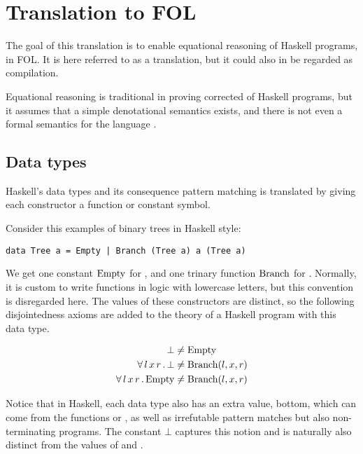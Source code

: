 \section{Translation to FOL}

The goal of this translation is to enable equational reasoning of
Haskell programs, in FOL. It is here referred to as a translation, but
it could also in be regarded as compilation.

Equational reasoning is traditional in proving corrected of Haskell
programs, but it assumes that a simple denotational semantics exists,
and there is not even a formal semantics for the language
\cite{chasingbot}.

\subsection{Data types}

Haskell's data types and its consequence pattern matching is
translated by giving each constructor a function or constant symbol.

Consider this examples of binary trees in Haskell style:

\begin{verbatim}
data Tree a = Empty | Branch (Tree a) a (Tree a)
\end{verbatim}

We get one constant $\mathrm{Empty}$ for , and one trinary
function $\mathrm{Branch}$ for . Normally, it is custom
to write functions in logic with lowercase letters, but this
convention is disregarded here. The values of these constructors are
distinct, so the following disjointedness axioms are added to the
theory of a Haskell program with this data type.

\begin{align*}
\mathrm{\bot} &  \neq \mathrm{Empty}\\
 \forall \, l \,  x \,  r \,  . \,  \mathrm{\bot} &  \neq \mathrm{Branch}(l,x,r)\\
 \forall \, l \,  x \,  r \,  . \,  \mathrm{Empty} &  \neq \mathrm{Branch}(l,x,r)\\
\end{align*}

Notice that in Haskell, each data type also has an extra value, bottom, which
can come from the functions  or , as well as
irrefutable pattern matches but also non-terminating programs. The constant
$\bot$ captures this notion and is naturally also distinct from the values
of  and .

